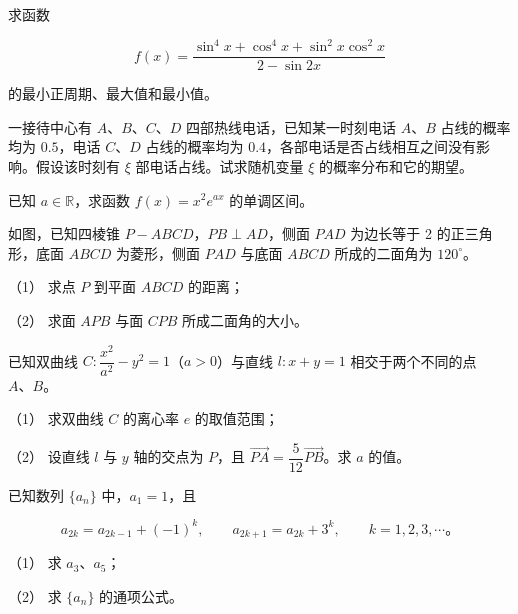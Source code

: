 \begin{question}
求函数

\nopagebreak[4]
\[
f(x)=\frac{\sin^4x+\cos^4x+\sin^2x\cos^2x}{2-\sin2x}
\]

的最小正周期、最大值和最小值。

\end{question}
\begin{question}
一接待中心有 $A\text{、}B\text{、}C\text{、}D$ 四部热线电话，已知某一时刻电话 $A\text{、}B$ 占线的概率均为 $0.5$，电话 $C\text{、}D$ 占线的概率均为 $0.4$，各部电话是否占线相互之间没有影响。假设该时刻有 $\xi$ 部电话占线。试求随机变量 $\xi$ 的概率分布和它的期望。

\end{question}
\begin{question}
已知 $a\in\mathbb R$，求函数 $f(x)=x^2e^{ax}$ 的单调区间。

\Needspace{0.4\textheight}
\end{question}
\begin{question}
如图，已知四棱锥 $P-ABCD$，$PB\perp AD$，侧面 $PAD$ 为边长等于 2 的正三角形，底面 $ABCD$ 为菱形，侧面 $PAD$ 与底面 $ABCD$ 所成的二面角为 $120^\circ$。
\nopagebreak[4]
\begin{center}\end{center}
\nopagebreak[4]
（1） 求点 $P$ 到平面 $ABCD$ 的距离；

（2） 求面 $APB$ 与面 $CPB$ 所成二面角的大小。

\end{question}
\begin{question}
已知双曲线 $C:\dfrac{x^2}{a^2}-y^2=1$（$a>0$）与直线 $l:x+y=1$ 相交于两个不同的点 $A\text{、}B$。

（1） 求双曲线 $C$ 的离心率 $e$ 的取值范围；

（2） 设直线 $l$ 与 $y$ 轴的交点为 $P$，且 $\overrightarrow{PA}=\dfrac5{12}\overrightarrow{PB}$。求 $a$ 的值。

\end{question}
\begin{question}
已知数列 $\{a_n\}$ 中，$a_1=1$，且

\nopagebreak[4]
\[
a_{2k}=a_{2k-1}+(-1)^k,\qquad a_{2k+1}=a_{2k}+3^k,\qquad k=1,2,3,\cdots\text{。}
\]

（1） 求 $a_3\text{、}a_5$；

（2） 求 $\{a_n\}$ 的通项公式。

\end{question}